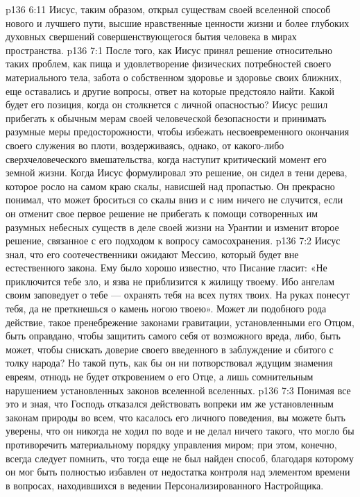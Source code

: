 \vs p136 6:11 Иисус, таким образом, открыл существам своей вселенной способ нового и лучшего пути, высшие нравственные ценности жизни и более глубоких духовных свершений совершенствующегося бытия человека в мирах пространства.
\vs p136 7:1 После того, как Иисус принял решение относительно таких проблем, как пища и удовлетворение физических потребностей своего материального тела, забота о собственном здоровье и здоровье своих ближних, еще оставались и другие вопросы, ответ на которые предстояло найти. Какой будет его позиция, когда он столкнется с личной опасностью? Иисус решил прибегать к обычным мерам своей человеческой безопасности и принимать разумные меры предосторожности, чтобы избежать несвоевременного окончания своего служения во плоти, воздерживаясь, однако, от какого\hyp{}либо сверхчеловеческого вмешательства, когда наступит критический момент его земной жизни. Когда Иисус формулировал это решение, он сидел в тени дерева, которое росло на самом краю скалы, нависшей над пропастью. Он прекрасно понимал, что может броситься со скалы вниз и с ним ничего не случится, если он отменит свое первое решение не прибегать к помощи сотворенных им разумных небесных существ в деле своей жизни на Урантии и изменит второе решение, связанное с его подходом к вопросу самосохранения.
\vs p136 7:2 Иисус знал, что его соотечественники ожидают Мессию, который будет вне естественного закона. Ему было хорошо известно, что Писание гласит: «Не приключится тебе зло, и язва не приблизится к жилищу твоему. Ибо ангелам своим заповедует о тебе --- охранять тебя на всех путях твоих. На руках понесут тебя, да не преткнешься о камень ногою твоею». Может ли подобного рода действие, такое пренебрежение законами гравитации, установленными его Отцом, быть оправдано, чтобы защитить самого себя от возможного вреда, либо, быть может, чтобы снискать доверие своего введенного в заблуждение и сбитого с толку народа? Но такой путь, как бы он ни потворствовал ждущим знамения евреям, отнюдь не будет откровением о его Отце, а лишь сомнительным нарушением установленных законов вселенной вселенных.
\vs p136 7:3 \pc Понимая все это и зная, что Господь отказался действовать вопреки им же установленным законам природы во всем, что касалось его личного поведения, вы можете быть уверены, что он никогда не ходил по воде и не делал ничего такого, что могло бы противоречить материальному порядку управления миром; при этом, конечно, всегда следует помнить, что тогда еще не был найден способ, благодаря которому он мог быть полностью избавлен от недостатка контроля над элементом времени в вопросах, находившихся в ведении Персонализированного Настройщика.
